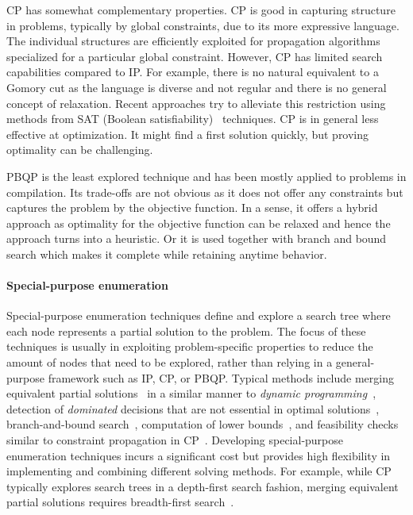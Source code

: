 \documentclass[acmsmall,authorversion,nonacm]{acmart}
\begin{document}
CP has somewhat complementary properties. CP is good in capturing
structure in problems, typically by global constraints, due to its
more expressive language.  The individual structures are efficiently
exploited for propagation algorithms specialized for a particular
global constraint. However, CP has limited search capabilities
compared to IP. For example, there is no natural equivalent to a
Gomory cut as the language is diverse and not regular and there is no
general concept of relaxation. Recent approaches try to alleviate this
restriction using methods from SAT (Boolean
satisfiability)~\cite{lazy-clause} techniques. CP is in general less
effective at optimization. It might find a first solution quickly, but
proving optimality can be challenging.

PBQP is the least explored technique and has been mostly applied to
problems in compilation. Its trade-offs are not obvious as it does not
offer any constraints but captures the problem by the objective
function. In a sense, it offers a hybrid approach as optimality for
the objective function can be relaxed and hence the approach turns
into a heuristic. Or it is used together with branch and bound search
which makes it complete while retaining anytime behavior.

\paragraph{Special-purpose enumeration}

Special-purpose enumeration techniques define and explore a search
tree where each node represents a partial solution to the problem.
The focus of these techniques is usually in exploiting
problem-specific properties to reduce the amount of nodes that need to
be explored, rather than relying in a general-purpose framework such
as IP, CP, or PBQP.
Typical methods include merging equivalent partial
solutions~\cite{Kessler2001} in a similar manner to \emph{dynamic
  programming}~\cite{Cormen2009}, detection of \emph{dominated}
decisions that are not essential in optimal
solutions~\cite{Ramamoorthy1972}, branch-and-bound
search~\cite{Shobaki2004}, computation of lower
bounds~\cite{Rim1994,Langevin1996}, and feasibility checks similar to
constraint propagation in CP~\cite{Shobaki2004}.
Developing special-purpose enumeration techniques incurs a significant
cost but provides high flexibility in implementing and combining
different solving methods.
For example, while CP typically explores search trees in a depth-first
search fashion, merging equivalent partial solutions requires
breadth-first search~\cite{Kessler2001}.
\end{document}
